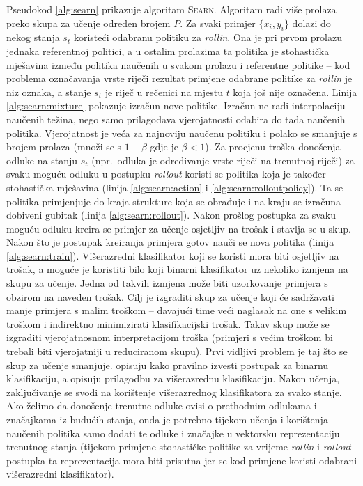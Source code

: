 Pseudokod \ref{alg:searn} prikazuje algoritam \textsc{Searn}. Algoritam radi
više prolaza preko skupa za učenje određen brojem $P$. Za svaki primjer $\{x_i,
y_i\}$ dolazi do nekog stanja $s_t$ koristeći odabranu politiku za
\textit{rollin}. Ona je pri prvom prolazu jednaka referentnoj politici, a u
ostalim prolazima ta politika je stohastička mješavina između politika naučenih
u svakom prolazu i referentne politike -- kod problema označavanja vrste riječi
rezultat primjene odabrane politike za \textit{rollin} je niz oznaka, a stanje $s_t$ je
riječ u rečenici na mjestu $t$ koja još nije označena. Linija
\ref{alg:searn:mixture} pokazuje izračun nove politike. Izračun ne radi
interpolaciju naučenih težina, nego samo prilagođava vjerojatnosti odabira do
tada naučenih politika. Vjerojatnost je veća za najnoviju naučenu politiku i
polako se smanjuje s brojem prolaza (množi se s $1-\beta$ gdje je $\beta < 1$).
Za procjenu troška donošenja odluke na stanju $s_t$ (npr.~odluka je određivanje
vrste riječi na trenutnoj riječi) za svaku moguću odluku u postupku \textit{rollout}
koristi se politika koja je također stohastička mješavina (linija
\ref{alg:searn:action} i \ref{alg:searn:rolloutpolicy}). Ta se politika
primjenjuje do kraja strukture koja se obrađuje i na kraju se izračuna dobiveni
gubitak (linija \ref{alg:searn:rollout}). Nakon prošlog postupka za svaku moguću
odluku kreira se primjer za učenje osjetljiv na trošak i stavlja se u skup.
Nakon što je postupak kreiranja primjera gotov nauči se nova politika (linija
\ref{alg:searn:train}). Višerazredni klasifikator koji se koristi mora biti
osjetljiv na trošak, a moguće je koristiti bilo koji binarni klasifikator uz
nekoliko izmjena na skupu za učenje. Jedna od takvih izmjena može biti
uzorkovanje primjera s obzirom na naveden trošak. Cilj je izgraditi skup za
učenje koji će sadržavati manje primjera s malim troškom -- davajući time veći
naglasak na one s velikim troškom i indirektno minimizirati klasifikacijski
trošak. Takav skup može se izgraditi vjerojatnosnom interpretacijom troška
(primjeri s većim troškom bi trebali biti vjerojatniji u reduciranom skupu).
Prvi vidljivi problem je taj što se skup za učenje smanjuje.
\citet{zadrozny2003cost} opisuju kako pravilno izvesti postupak za binarnu
klasifikaciju, a \citet{beygelzimer2005weighted, beygelzimer2005error} opisuju
prilagodbu za višerazrednu klasifikaciju. Nakon učenja, zaključivanje se svodi
na korištenje višerazrednog klasifikatora za svako stanje. Ako želimo da
donošenje trenutne odluke ovisi o prethodnim odlukama i značajkama iz budućih
stanja, onda je potrebno tijekom učenja i korištenja naučenih politika samo
dodati te odluke i značajke u vektorsku reprezentaciju trenutnog stanja (tijekom
primjene stohastičke politike za vrijeme \textit{rollin} i \textit{rollout}
postupka ta reprezentacija mora biti prisutna jer se kod primjene koristi
odabrani višerazredni klasifikator).

